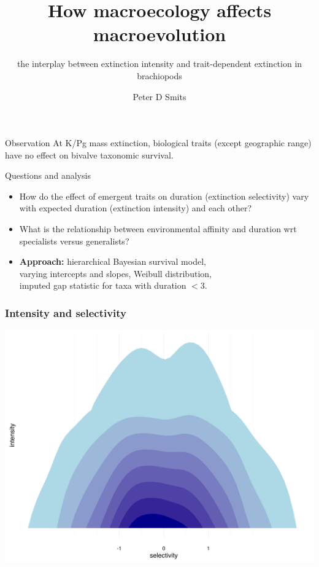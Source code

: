 \documentclass{beamer}
\title{How macroecology affects macroevolution}
\subtitle{the interplay between extinction intensity and trait-dependent extinction in brachiopods}
\author{Peter D Smits}
\institute{Committee on Evolutionary Biology, University of Chicago}
\date{}
\begin{document}
\begin{frame}
  \maketitle
\end{frame}

\begin{frame}
  \begin{alertblock}{Observation}
    At K/Pg mass extinction, biological traits (except geographic range) have no effect on \alert{bivalve} taxonomic survival.

  \end{alertblock}
\end{frame}

\begin{frame}
  \begin{alertblock}{Questions and analysis}
    \begin{itemize}
      \item How do the effect of emergent traits on duration (\alert{extinction selectivity}) vary with expected duration (\alert{extinction intensity}) and each other?
      \item What is the relationship between environmental affinity and duration wrt specialists versus generalists?
      \item \textbf{Approach:} hierarchical Bayesian survival model, \\varying intercepts and slopes, Weibull distribution, \\imputed gap statistic for taxa with duration \(< 3\).
    \end{itemize}
  \end{alertblock}
\end{frame}

\begin{frame}
  \frametitle{Intensity and selectivity}
  \begin{center}
    \includegraphics[width = \textwidth,height = 0.8\textheight,keepaspectratio = true]{figure/base_hypo}
  \end{center}
\end{frame}
\end{document}
